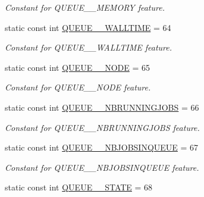 \begin{DoxyCompactItemize}
\begin{DoxyCompactList}\small\item\em Constant for QUEUE\_\-\_\-MEMORY feature. \item\end{DoxyCompactList}\item 
\hypertarget{classTMS__Data_1_1TMS__DataPackage_a8e2adb22a73f0c284690c514f1fc3b44}{
static const int \hyperlink{classTMS__Data_1_1TMS__DataPackage_a8e2adb22a73f0c284690c514f1fc3b44}{QUEUE\_\-\_\-WALLTIME} = 64}
\label{classTMS__Data_1_1TMS__DataPackage_a8e2adb22a73f0c284690c514f1fc3b44}

\begin{DoxyCompactList}\small\item\em Constant for QUEUE\_\-\_\-WALLTIME feature. \item\end{DoxyCompactList}\item 
\hypertarget{classTMS__Data_1_1TMS__DataPackage_af4c49b89f6f16a6be7368ef2eb1ef253}{
static const int \hyperlink{classTMS__Data_1_1TMS__DataPackage_af4c49b89f6f16a6be7368ef2eb1ef253}{QUEUE\_\-\_\-NODE} = 65}
\label{classTMS__Data_1_1TMS__DataPackage_af4c49b89f6f16a6be7368ef2eb1ef253}

\begin{DoxyCompactList}\small\item\em Constant for QUEUE\_\-\_\-NODE feature. \item\end{DoxyCompactList}\item 
\hypertarget{classTMS__Data_1_1TMS__DataPackage_a7c359d894bfd3dc66e8fccf4b39cde21}{
static const int \hyperlink{classTMS__Data_1_1TMS__DataPackage_a7c359d894bfd3dc66e8fccf4b39cde21}{QUEUE\_\-\_\-NBRUNNINGJOBS} = 66}
\label{classTMS__Data_1_1TMS__DataPackage_a7c359d894bfd3dc66e8fccf4b39cde21}

\begin{DoxyCompactList}\small\item\em Constant for QUEUE\_\-\_\-NBRUNNINGJOBS feature. \item\end{DoxyCompactList}\item 
\hypertarget{classTMS__Data_1_1TMS__DataPackage_a7cc95c4b02e351514307611667e58fb4}{
static const int \hyperlink{classTMS__Data_1_1TMS__DataPackage_a7cc95c4b02e351514307611667e58fb4}{QUEUE\_\-\_\-NBJOBSINQUEUE} = 67}
\label{classTMS__Data_1_1TMS__DataPackage_a7cc95c4b02e351514307611667e58fb4}

\begin{DoxyCompactList}\small\item\em Constant for QUEUE\_\-\_\-NBJOBSINQUEUE feature. \item\end{DoxyCompactList}\item 
\hypertarget{classTMS__Data_1_1TMS__DataPackage_a60dc37bf7ff35898da2de2a3f8faeef5}{
static const int \hyperlink{classTMS__Data_1_1TMS__DataPackage_a60dc37bf7ff35898da2de2a3f8faeef5}{QUEUE\_\-\_\-STATE} = 68}
\label{classTMS__Data_1_1TMS__DataPackage_a60dc37bf7ff35898da2de2a3f8faeef5}


\end{DoxyCompactItemize}
